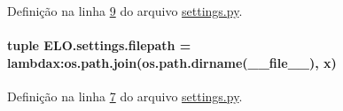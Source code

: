 Definição na linha \hyperlink{settings_8py_source_l00009}{9} do arquivo \hyperlink{settings_8py_source}{settings.\-py}.

\hypertarget{namespaceELO_1_1settings_a7730264ddd478343e0f282f36d4a5ab4}{
\paragraph[{filepath}]{\setlength{\rightskip}{0pt plus 5cm}tuple E\-L\-O.\-settings.\-filepath = lambdax\-:os.\-path.\-join(os.\-path.\-dirname(\-\_\-\-\_\-file\-\_\-\-\_\-), x)}}\label{namespaceELO_1_1settings_a7730264ddd478343e0f282f36d4a5ab4}


Definição na linha \hyperlink{settings_8py_source_l00007}{7} do arquivo \hyperlink{settings_8py_source}{settings.\-py}.

